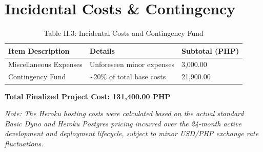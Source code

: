 \section{Incidental Costs \& Contingency}

\begin{table}[H]
\centering
\caption*{Table H.3: Incidental Costs and Contingency Fund}
\begin{tabular}{|p{4.5cm}|p{6.3cm}|p{2.5cm}|}
\hline
\textbf{Item Description} & \textbf{Details} & \textbf{Subtotal (PHP)} \\ \hline
Miscellaneous Expenses & Unforeseen minor expenses & 3,000.00 \\ \hline
Contingency Fund & \textasciitilde 20\% of total base costs & 21,900.00 \\ \hline
\end{tabular}
\end{table}

\textbf{Total Finalized Project Cost: 131,400.00 PHP}

\vspace{1em}
\noindent\textit{Note: The Heroku hosting costs were calculated based on the actual standard Basic Dyno and Heroku Postgres pricing incurred over the 24-month active development and deployment lifecycle, subject to minor USD/PHP exchange rate fluctuations.}
